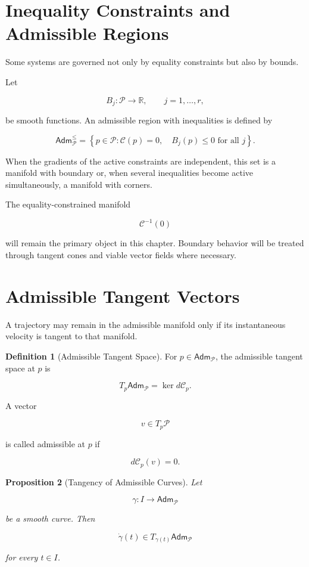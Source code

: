\documentclass[11pt,oneside]{book}
\numberwithin{equation}{chapter}
\theoremstyle{definition}
\newtheorem{definition}{Definition}[chapter]
\theoremstyle{plain}
\newtheorem{proposition}[definition]{Proposition}
\newcommand{\Adm}{\mathsf{Adm}}
\begin{document}
\section{Inequality Constraints and Admissible Regions}

Some systems are governed not only by equality constraints but also by
bounds.

Let

\[
B_j:\mathcal P\longrightarrow\mathbb R,
\qquad
j=1,\ldots,r,
\]

be smooth functions. An admissible region with inequalities is defined by

\[
\Adm_{\mathcal P}^{\leq}
=
\left\{
p\in\mathcal P:
\mathcal C(p)=0,
\quad
B_j(p)\leq 0
\text{ for all }j
\right\}.
\]

When the gradients of the active constraints are independent, this set is a
manifold with boundary or, when several inequalities become active
simultaneously, a manifold with corners.

The equality-constrained manifold

\[
\mathcal C^{-1}(0)
\]

will remain the primary object in this chapter. Boundary behavior will be
treated through tangent cones and viable vector fields where necessary.

\section{Admissible Tangent Vectors}

A trajectory may remain in the admissible manifold only if its instantaneous
velocity is tangent to that manifold.

\begin{definition}[Admissible Tangent Space]

For \(p\in\Adm_{\mathcal P}\), the admissible tangent space at \(p\) is

\[
T_p\Adm_{\mathcal P}
=
\ker d\mathcal C_p.
\]

A vector

\[
v\in T_p\mathcal P
\]

is called admissible at \(p\) if

\[
d\mathcal C_p(v)=0.
\]

\end{definition}

\begin{proposition}[Tangency of Admissible Curves]

Let

\[
\gamma:I\longrightarrow\Adm_{\mathcal P}
\]

be a smooth curve. Then

\[
\dot\gamma(t)
\in
T_{\gamma(t)}\Adm_{\mathcal P}
\]

for every \(t\in I\).

\end{proposition}
\end{document}
